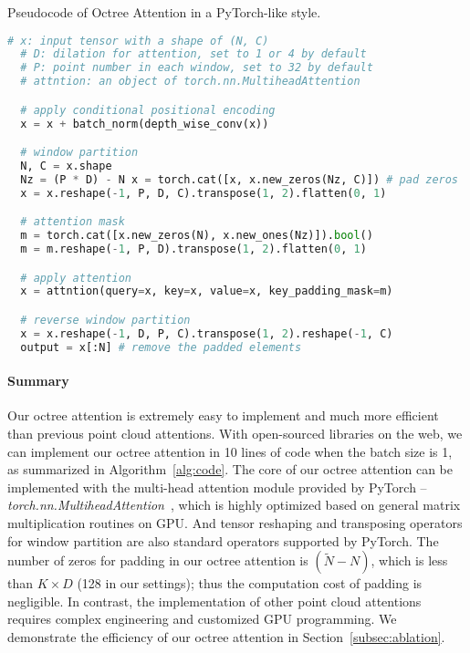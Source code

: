 \documentclass[acmtog,screen,authorversion]{acmart}
\begin{document}
\begin{algorithm}[t]
  \caption{\small Pseudocode of Octree Attention in a PyTorch-like style.}
  \label{alg:code}
  \begin{lstlisting}[language=python]
  # x: input tensor with a shape of (N, C)
  # D: dilation for attention, set to 1 or 4 by default
  # P: point number in each window, set to 32 by default
  # attntion: an object of torch.nn.MultiheadAttention

  # apply conditional positional encoding
  x = x + batch_norm(depth_wise_conv(x))

  # window partition
  N, C = x.shape
  Nz = (P * D) - N x = torch.cat([x, x.new_zeros(Nz, C)]) # pad zeros
  x = x.reshape(-1, P, D, C).transpose(1, 2).flatten(0, 1)

  # attention mask
  m = torch.cat([x.new_zeros(N), x.new_ones(Nz)]).bool()
  m = m.reshape(-1, P, D).transpose(1, 2).flatten(0, 1)

  # apply attention
  x = attntion(query=x, key=x, value=x, key_padding_mask=m)

  # reverse window partition
  x = x.reshape(-1, D, P, C).transpose(1, 2).reshape(-1, C)
  output = x[:N] # remove the padded elements
  \end{lstlisting}
\end{algorithm}


\paragraph{Summary}
Our octree attention is extremely easy to implement and much more efficient than previous point cloud attentions.
With open-sourced libraries on the web, we can implement our octree attention in 10 lines of code when the batch size is 1, as summarized in Algorithm~\ref{alg:code}.
The core of our octree attention can be implemented with the multi-head attention module provided by PyTorch -- \emph{torch.nn.MultiheadAttention}~\cite{Paszke2019}, which is highly optimized based on general matrix multiplication routines on GPU.
And tensor reshaping and transposing operators for window partition are also standard operators supported by PyTorch.
The number of zeros for padding in our octree attention is $(\tilde{N} - N)$, which is less than $K \times D$ (128 in our settings); thus the computation cost of padding is negligible.
In contrast, the implementation of other point cloud attentions~\cite{Sun2022,Lai2022,Fan2022} requires complex engineering and customized GPU programming.
We demonstrate the efficiency of our octree attention in Section~\ref{subsec:ablation}.
\end{document}
